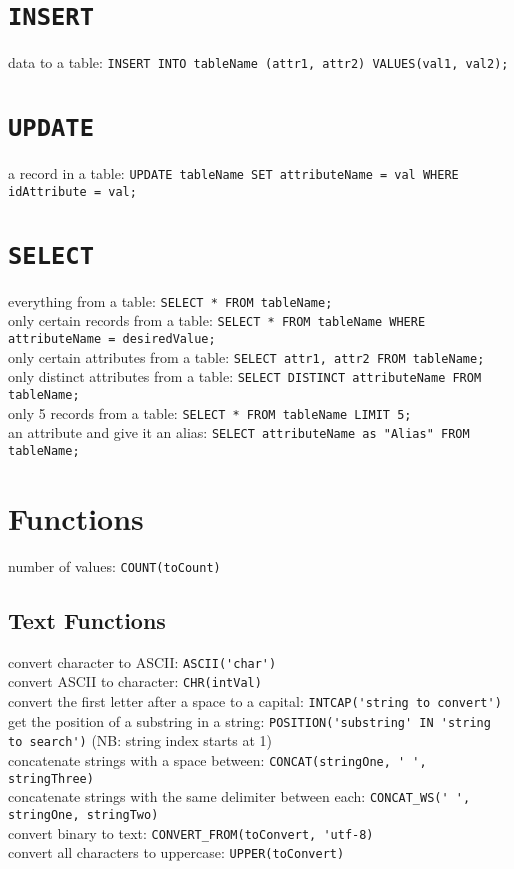 \documentclass[a4paper,11pt]{article}
\begin{document}
\section{\texttt{INSERT}}
data to a table: \verb|INSERT INTO tableName (attr1, attr2) VALUES(val1, val2);|

\section{\texttt{UPDATE}}
a record in a table: \verb|UPDATE tableName SET attributeName = val WHERE idAttribute = val;|

\section{\texttt{SELECT}}
everything from a table: \verb|SELECT * FROM tableName;|\\
only certain records from a table: \verb|SELECT * FROM tableName WHERE attributeName = desiredValue;|\\
only certain attributes from a table: \verb|SELECT attr1, attr2 FROM tableName;|\\
only distinct attributes from a table: \verb|SELECT DISTINCT attributeName FROM tableName;|\\
only 5 records from a table: \verb|SELECT * FROM tableName LIMIT 5;|\\
an attribute and give it an alias: \verb|SELECT attributeName as "Alias" FROM tableName;|

\section{Functions}
number of values: \verb|COUNT(toCount)|
\subsection{Text Functions}
convert character to ASCII: \verb|ASCII('char')|\\
convert ASCII to character: \verb|CHR(intVal)|\\
convert the first letter after a space to a capital: \verb|INTCAP('string to convert')|\\
get the position of a substring in a string: \verb|POSITION('substring' IN 'string to search')| (NB: string index starts at 1)\\
concatenate strings with a space between: \verb|CONCAT(stringOne, ' ', stringThree)|\\
concatenate strings with the same delimiter between each: \verb|CONCAT_WS(' ', stringOne, stringTwo)|\\
convert binary to text: \verb|CONVERT_FROM(toConvert, 'utf-8)|\\
convert all characters to uppercase: \verb|UPPER(toConvert)|
\end{document}
